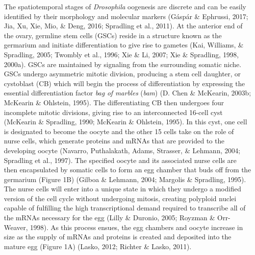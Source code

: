 \documentclass[12pt,oneside]{reedthesis}
\begin{document}
The spatiotemporal stages of \emph{Drosophila} oogenesis are discrete and can
be easily identified by their morphology and molecular markers
(Gáspár \& Ephrussi, 2017; Jia, Xu, Xie, Mio, \& Deng, 2016; Spradling et al., 2011). At the anterior end of
the ovary, germline stem cells (GSCs) reside in a structure known as the
germarium and initiate differentiation to give rise to gametes
(Kai, Williams, \& Spradling, 2005; Twombly et al., 1996; Xie \& Li, 2007; Xie \& Spradling, 1998, 2000a). GSCs
are maintained by signaling from the surrounding somatic niche. GSCs
undergo asymmetric mitotic division, producing a stem cell daughter, or
cystoblast (CB) which will begin the process of differentiation by
expressing the essential differentiation factor \emph{bag of marbles} (\emph{bam})
(D. Chen \& McKearin, 2003b; McKearin \& Ohlstein, 1995). The differentiating CB then undergoes
four incomplete mitotic divisions, giving rise to an interconnected
16-cell cyst (McKearin \& Spradling, 1990; McKearin \& Ohlstein, 1995). In this cyst, one
cell is designated to become the oocyte and the other 15 cells take on
the role of nurse cells, which generate proteins and mRNAs that are
provided to the developing oocyte (Navarro, Puthalakath, Adams, Strasser, \& Lehmann, 2004; Spradling et al., 1997).
The specified oocyte and its associated nurse cells are then
encapsulated by somatic cells to form an egg chamber that buds off from
the germarium (Figure 1B) (Gilboa \& Lehmann, 2004; Margolis \& Spradling, 1995). The nurse
cells will enter into a unique state in which they undergo a modified
version of the cell cycle without undergoing mitosis, creating polyploid
nuclei capable of fulfilling the high transcriptional demand required to
transcribe all of the mRNAs necessary for the egg (Lilly \& Duronio, 2005; Royzman \& Orr-Weaver, 1998). As this process ensues, the egg chambers and oocyte
increase in size as the supply of mRNAs and proteins is created and
deposited into the mature egg (Figure 1A) (Lasko, 2012; Richter \& Lasko, 2011).
\end{document}
